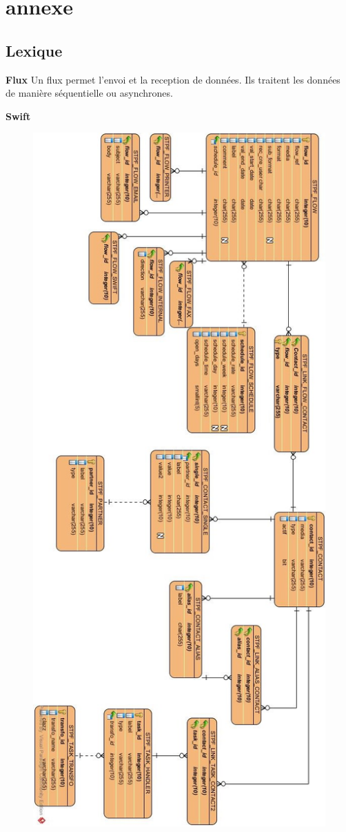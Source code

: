\chapter{annexe}

\section{Lexique}

\textbf{Flux}
Un flux permet l'envoi et la reception de données. Ils traitent les données de manière séquentielle ou asynchrones.



\textbf{Swift}


\begin{figure} %
\centering
\includegraphics[scale=0.6]{Images/FlowDetailsExistant.jpg}

\end{figure}
